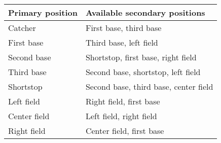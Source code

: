 \begin{deepEnumerate}
            \begin{center}
                  \begin{tabular}{|l|l|}
                        \hline
                        Primary position & Available secondary positions \\
                        \hline
                        Catcher & First base, third base \\
                        \hline
                        First base & Third base, left field \\
                        \hline
                        Second base & Shortstop, first base, right field \\
                        \hline
                        Third base & Second base, shortstop, left field \\
                        \hline
                        Shortstop & Second base, third base, center field \\
                        \hline
                        Left field & Right field, first base \\
                        \hline
                        Center field & Left field, right field \\
                        \hline
                        Right field & Center field, first base \\
                        \hline 
                  \end{tabular}
            \end{center}
\end{deepEnumerate}

